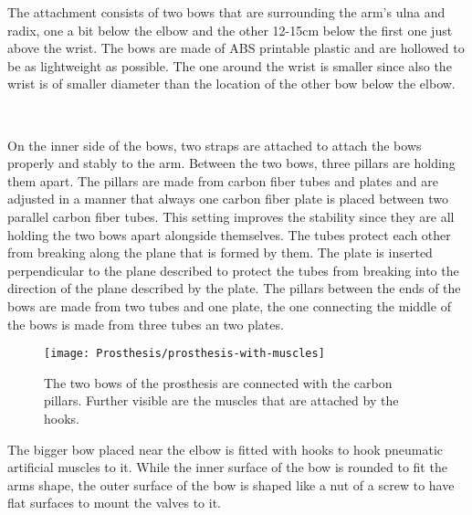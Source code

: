 \documentclass[main]{subfiles}
\begin{document}
The attachment consists of two bows that are surrounding the arm's ulna and radix, one a bit below the elbow and the other 12-15cm below the first one just above the wrist. The bows are made of ABS printable plastic and are hollowed to be as lightweight as possible. The one around the wrist is smaller since also the wrist is of smaller diameter than the location of the other bow below the elbow.
 
\begin{figure}[htp]
\centering
{}\hspace{0.1\textwidth}
\\
\end{figure}
 
On the inner side of the bows, two straps are attached to attach the bows properly and stably to the arm. Between the two bows, three pillars are holding them apart. The pillars are made from carbon fiber tubes and plates and are adjusted in a manner that always one carbon fiber plate is placed between two parallel carbon fiber tubes. This setting improves the stability since they are all holding the two bows apart alongside themselves. The tubes protect each other from breaking along the plane that is formed by them. The plate is inserted perpendicular to the plane described to protect the tubes from breaking into the direction of the plane described by the plate. The pillars between the ends of the bows are made from two tubes and one plate, the one connecting the middle of the bows is made from three tubes an two plates.
  
\begin{figure}[htp]
\centering
\texttt{[image: Prosthesis/prosthesis-with-muscles]}
\caption[Two bows of attachment]{The two bows of the prosthesis are connected with the carbon pillars. Further visible are the muscles that are attached by the hooks.}
\label{pillars}
\end{figure}
  
The bigger bow placed near the elbow is fitted with hooks to hook pneumatic artificial muscles to it. While the inner surface of the bow is rounded to fit the arms shape, the outer surface of the bow is shaped like a nut of a screw to have flat surfaces to mount the valves to it. 
   
\end{document}
